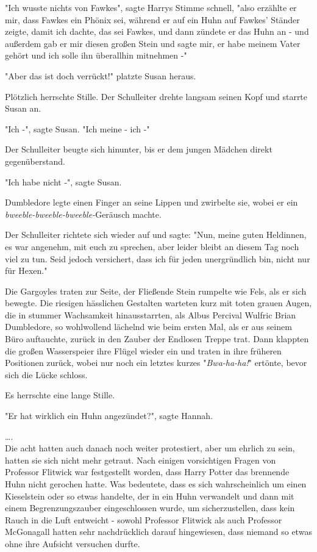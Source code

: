 {"Ich wusste nichts von Fawkes", sagte Harrys Stimme schnell, "also erzählte er mir, dass Fawkes ein Phönix sei, während er auf ein Huhn auf Fawkes' Ständer zeigte, damit ich dachte, das sei Fawkes, und dann zündete er das Huhn an - und außerdem gab er mir diesen großen Stein und sagte mir, er habe meinem Vater gehört und ich solle ihn überallhin mitnehmen -"

"Aber das ist doch verrückt!" platzte Susan heraus.

Plötzlich herrschte Stille. Der Schulleiter drehte langsam seinen Kopf und starrte Susan an.

"Ich -", sagte Susan. "Ich meine - ich -"

Der Schulleiter beugte sich hinunter, bis er dem jungen Mädchen direkt gegenüberstand.

"Ich habe nicht -", sagte Susan.

Dumbledore legte einen Finger an seine Lippen und zwirbelte sie, wobei er ein \emph{bweeble-bweeble-bweeble-}Geräusch machte.

Der Schulleiter richtete sich wieder auf und sagte: "Nun, meine guten Heldinnen, es war angenehm, mit euch zu sprechen, aber leider bleibt an diesem Tag noch viel zu tun. Seid jedoch versichert, dass ich für jeden unergründlich bin, nicht nur für Hexen."

Die Gargoyles traten zur Seite, der Fließende Stein rumpelte wie Fels, als er sich bewegte. Die riesigen hässlichen Gestalten warteten kurz mit toten grauen Augen, die in stummer Wachsamkeit hinausstarrten, als Albus Percival Wulfric Brian Dumbledore, so wohlwollend lächelnd wie beim ersten Mal, als er aus seinem Büro auftauchte, zurück in den Zauber der Endlosen Treppe trat. Dann klappten die großen Wasserspeier ihre Flügel wieder ein und traten in ihre früheren Positionen zurück, wobei nur noch ein letztes kurzes "\emph{Bwa-ha-ha!}" ertönte, bevor sich die Lücke schloss.

Es herrschte eine lange Stille.

"Er hat wirklich ein Huhn angezündet?", sagte Hannah.

….\\ Die acht hatten auch danach noch weiter protestiert, aber um ehrlich zu sein, hatten sie sich nicht mehr getraut. Nach einigen vorsichtigen Fragen von Professor Flitwick war festgestellt worden, dass Harry Potter das brennende Huhn nicht gerochen hatte. Was bedeutete, dass es sich wahrscheinlich um einen Kieselstein oder so etwas handelte, der in ein Huhn verwandelt und dann mit einem Begrenzungszauber eingeschlossen wurde, um sicherzustellen, dass kein Rauch in die Luft entweicht - sowohl Professor Flitwick als auch Professor McGonagall hatten sehr nachdrücklich darauf hingewiesen, dass niemand so etwas ohne ihre Aufsicht versuchen durfte.

}
